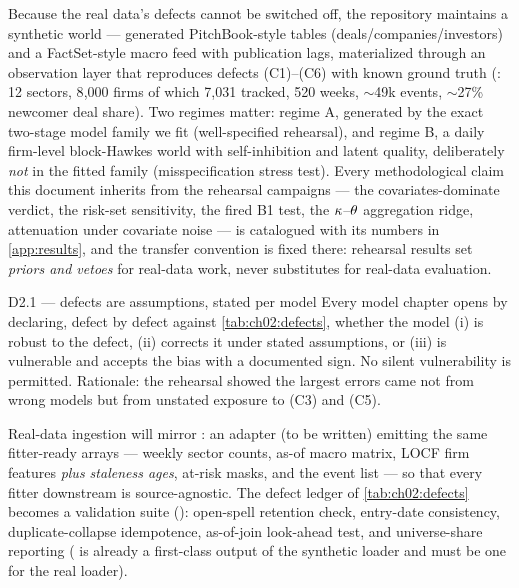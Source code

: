 Because the real data's defects cannot be switched off, the repository
maintains a synthetic world --- generated PitchBook-style tables
(deals/companies/investors) and a FactSet-style macro feed with publication
lags, materialized through an observation layer that reproduces defects
(C1)--(C6) with known ground truth (: 12 sectors, 8{,}000
firms of which 7{,}031 tracked, 520 weeks, $\sim$49k events, $\sim$27\%
newcomer deal share). Two regimes matter: regime A, generated by the exact
two-stage model family we fit (well-specified rehearsal), and regime B, a
daily firm-level block-Hawkes world with self-inhibition and latent
quality, deliberately \emph{not} in the fitted family (misspecification
stress test). Every methodological claim this document inherits from the
rehearsal campaigns --- the covariates-dominate verdict, the risk-set
sensitivity, the fired B1 test, the $\kappa$--$\theta$ aggregation ridge,
attenuation under covariate noise --- is catalogued with its numbers in
\cref{app:results}, and the transfer convention is fixed there: rehearsal
results set \emph{priors and vetoes} for real-data work, never
substitutes for real-data evaluation.

\begin{decision}{D2.1 --- defects are assumptions, stated per model}
Every model chapter opens by declaring, defect by defect against
\cref{tab:ch02:defects}, whether the model (i) is robust to the defect,
(ii) corrects it under stated assumptions, or (iii) is vulnerable and
accepts the bias with a documented sign. No silent vulnerability is
permitted. Rationale: the rehearsal showed the largest errors came not
from wrong models but from unstated exposure to (C3) and (C5).
\end{decision}

\begin{codehooks}
Real-data ingestion will mirror : an adapter
 (to be written) emitting the same
fitter-ready arrays --- weekly sector counts, as-of macro matrix, LOCF firm
features \emph{plus staleness ages}, at-risk masks, and the event list ---
so that every fitter downstream is source-agnostic. The defect ledger of
\cref{tab:ch02:defects} becomes a validation suite
(): open-spell retention check, entry-date
consistency, duplicate-collapse idempotence, as-of-join look-ahead test,
and universe-share reporting ( is already a
first-class output of the synthetic loader and must be one for the real
loader).
\end{codehooks}
